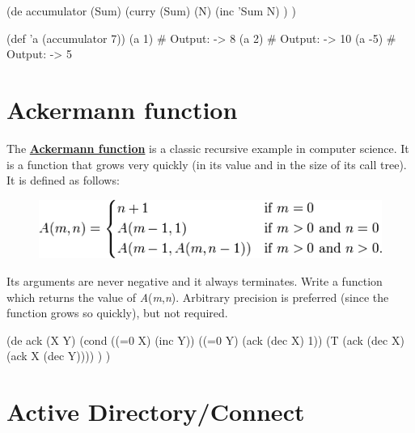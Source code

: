 \begin{wideverbatim}

(de accumulator (Sum)
   (curry (Sum) (N)
      (inc 'Sum N) ) )

(def 'a (accumulator 7))
(a 1)  # Output: -> 8
(a 2)  # Output: -> 10
(a -5)  # Output: -> 5

\end{wideverbatim}

\pagebreak{}
\section*{Ackermann function}

The
\textbf{\href{http://en.wikipedia.org/wiki/Ackermann\_function}{Ackermann
function}} is a classic recursive example in computer science. It is a
function that grows very quickly (in its value and in the size of its
call tree). It is defined as follows:

\begin{figure}[H]
\centering
\includegraphics[scale=.6]{graphics/0ae4053de098cc9554752b190a38bc56.png}
\end{figure}

Its arguments are never negative and it always terminates. Write a
function which returns the value of \emph{A}(\emph{m},\emph{n}).
Arbitrary precision is preferred (since the function grows so quickly),
but not required.

\begin{wideverbatim}

(de ack (X Y)
   (cond
      ((=0 X) (inc Y))
      ((=0 Y) (ack (dec X) 1))
      (T (ack (dec X) (ack X (dec Y)))) ) )

\end{wideverbatim}

\pagebreak{}
\section*{Active Directory/Connect}

